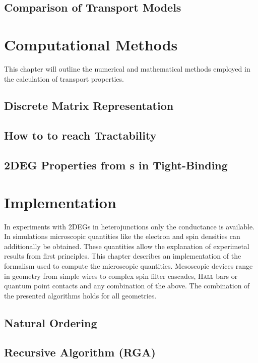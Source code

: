   \section{Comparison of Transport Models}
  
\chapter{Computational Methods}
This chapter will outline the numerical and mathematical methods employed in the calculation of transport properties.
  \section{Discrete Matrix Representation}\label{sec:discretematrixrep}
  
  \section{How to to reach Tractability}\label{sec:tractability}
  
  \section{2DEG Properties from \cgfnc s in Tight-Binding}\label{sec:observables}
  
\chapter{Implementation}
In experiments with 2DEGs in heterojunctions only the conductance is available. In simulations microscopic quantities like the electron and spin densities can additionally be obtained. These quantities allow the explanation of experimetal results from first principles. This chapter describes an implementation of the \gfnc{} formalism used to compute the microscopic quantities.
Mesoscopic devices range in geometry from simple wires to complex spin filter cascades, \textsc{Hall} bars or quantum point contacts and any combination of the above. The combination of the presented algorithms holds for all geometries.
\section{Natural Ordering}\label{sec:naruralordering}

\section{Recursive \cgfnc{} Algorithm (RGA)} \label{sec:recursivegreenfncalgorithm}

